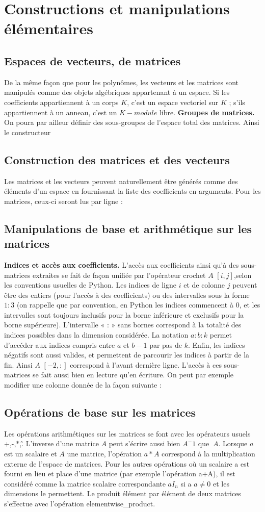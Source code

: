 \section{Constructions et manipulations élémentaires}
\subsection{ Espaces de vecteurs, de matrices}
De la même façon que pour les polynômes, les vecteurs et les matrices sont
manipulés comme des objets algébriques appartenant à un espace. Si les coefficients
appartiennent à un corps $K$, c’est un espace vectoriel sur $K$ ; s’ils appartiennent
à un anneau, c’est un $K-module$ libre.
\textbf{Groupes de matrices.} On poura par ailleur définir des sous-groupes de l'espace total des matrices. Ainsi le constructeur 
\subsection{ Construction des matrices et des vecteurs}
Les matrices et les vecteurs peuvent naturellement être générés comme des éléments d’un espace en fournissant la liste des coefficients en arguments. Pour les matrices, ceux-ci seront lus par ligne :
\subsection{ Manipulations de base et arithmétique sur les matrices}
\textbf{Indices et accès aux coefficients.} L'accès aux coefficients ainsi qu’à des
sous-matrices extraites se fait de façon unifiée par l’opérateur crochet $A$ $\left[i, j\right]$,selon les 
conventions usuelles de Python. Les indices de ligne $i$ et de colonne $j$ peuvent être des entiers (pour 
l’accès à des coefficients) ou des intervalles sous la forme $1:3$ (on rappelle que par convention, en Python 
les indices commencent à $0$, et les intervalles sont toujours inclusifs pour la borne inférieure et exclusifs 
pour la borne supérieure). L’intervalle « : » sans bornes correspond à la totalité des indices possibles dans la 
dimension considérée. La notation $a:b:k$ permet d’accéder aux indices compris entre $a$ et $b-1$ par pas de 
$k$. Enfin, les indices négatifs sont aussi valides, et permettent de parcourir les indices à partir de la
fin. Ainsi $A$ $\left[-2,:\right]$ correspond à l’avant dernière ligne. L'accès à ces sous-matrices
se fait aussi bien en lecture qu’en écriture. On peut par exemple modifier une colonne donnée de la façon 
suivante :
\subsection{ Opérations de base sur les matrices}
Les opérations arithmétiques sur les matrices se font avec les opérateurs usuels +,-,$\ast$,\^. L’inverse 
d’une matrice $A$ peut s’écrire aussi bien $A^-1$ que $~A$. Lorsque $a$ est un scalaire et $A$ une matrice, 
l’opération $a*A$ correspond à la multiplication externe de l’espace de matrices. Pour les autres opérations où 
un scalaire a est fourni en lieu et place d’une matrice (par exemple l’opération a+A), il est considéré comme la 
matrice scalaire correspondante $aI_{n}$ si a $a\neq 0$ et les dimensions le permettent. Le produit élément par 
élément de deux matrices s’effectue avec l’opération elementwise\_product.
